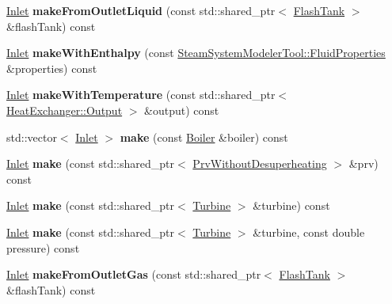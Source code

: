 \begin{DoxyCompactItemize}
\hyperlink{class_inlet}{Inlet} {\bfseries make\+From\+Outlet\+Liquid} (const std\+::shared\+\_\+ptr$<$ \hyperlink{class_flash_tank}{Flash\+Tank} $>$ \&flash\+Tank) const
\item 
\mbox{\label{class_inlet_factory_a9bc3a8b4a15f7a486b8c64b757c23f6e}} 
\hyperlink{class_inlet}{Inlet} {\bfseries make\+With\+Enthalpy} (const \hyperlink{struct_steam_system_modeler_tool_1_1_fluid_properties}{Steam\+System\+Modeler\+Tool\+::\+Fluid\+Properties} \&properties) const
\item 
\mbox{\label{class_inlet_factory_a8d71dcd9f0e2b4df202542281659732d}} 
\hyperlink{class_inlet}{Inlet} {\bfseries make\+With\+Temperature} (const std\+::shared\+\_\+ptr$<$ \hyperlink{struct_heat_exchanger_1_1_output}{Heat\+Exchanger\+::\+Output} $>$ \&output) const
\item 
\mbox{\label{class_inlet_factory_a770ec16a96976e7f808d8800bafbdf1b}} 
std\+::vector$<$ \hyperlink{class_inlet}{Inlet} $>$ {\bfseries make} (const \hyperlink{class_boiler}{Boiler} \&boiler) const
\item 
\mbox{\label{class_inlet_factory_abbb5f2f2644b1ad68a82571cab075947}} 
\hyperlink{class_inlet}{Inlet} {\bfseries make} (const std\+::shared\+\_\+ptr$<$ \hyperlink{class_prv_without_desuperheating}{Prv\+Without\+Desuperheating} $>$ \&prv) const
\item 
\mbox{\label{class_inlet_factory_a6642da76a5322ce70d55910075ff7de3}} 
\hyperlink{class_inlet}{Inlet} {\bfseries make} (const std\+::shared\+\_\+ptr$<$ \hyperlink{class_turbine}{Turbine} $>$ \&turbine) const
\item 
\mbox{\label{class_inlet_factory_a93287e435c4d429db96149c5e7591261}} 
\hyperlink{class_inlet}{Inlet} {\bfseries make} (const std\+::shared\+\_\+ptr$<$ \hyperlink{class_turbine}{Turbine} $>$ \&turbine, const double pressure) const
\item 
\mbox{\label{class_inlet_factory_a1c2ae68473be66b8636b420adb54ca94}} 
\hyperlink{class_inlet}{Inlet} {\bfseries make\+From\+Outlet\+Gas} (const std\+::shared\+\_\+ptr$<$ \hyperlink{class_flash_tank}{Flash\+Tank} $>$ \&flash\+Tank) const

\end{DoxyCompactItemize}
